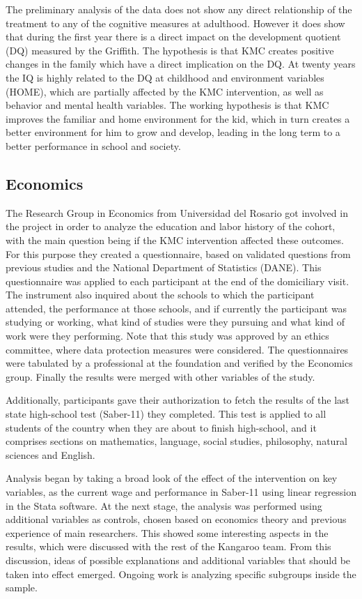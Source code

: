 The preliminary analysis of the data does not show any direct relationship of the treatment to any of the cognitive measures at adulthood. However it does show that during the first year there is a direct impact on the development quotient (DQ) measured by the Griffith. The hypothesis is that KMC creates positive changes in the family which have a direct implication on the DQ. At twenty years the IQ is highly related to the DQ at childhood and  environment variables (HOME), which are partially affected by the KMC intervention, as well as behavior and mental health variables. The working hypothesis is that KMC improves the familiar and home environment for the kid, which in turn creates a better environment for him to grow and develop, leading in the long term to a better performance in school and society.

\subsection{Economics}

The Research Group in Economics from Universidad del Rosario got involved in the project in order to analyze the education and labor history of the cohort, with the main question being if the KMC intervention affected these outcomes. For this purpose they created a questionnaire, based on validated questions from previous studies and the National Department of Statistics (DANE). This questionnaire was applied to each participant at the end of the domiciliary visit. The instrument also inquired about the schools to which the participant attended, the performance at those schools, and if currently the participant was studying or working, what kind of studies were they pursuing and what kind of work were they performing. Note that this study was approved by an ethics committee, where data protection measures were considered. The questionnaires were tabulated by a professional at the foundation and verified by the Economics group. Finally the results were merged with other variables of the study.

Additionally, participants gave their authorization to fetch the results of the last state high-school test (Saber-11) they completed. This test is applied to all students of the country when they are about to finish high-school, and it comprises sections on mathematics, language, social studies, philosophy,  natural sciences and English.

Analysis began by taking a broad look of the effect of the intervention on key variables, as the current wage and performance in Saber-11 using linear regression in the Stata software. At the next stage, the analysis was performed using additional variables as controls, chosen based on economics theory and previous experience of main researchers. This showed some interesting aspects in the results, which were discussed with the rest of the Kangaroo team. From this discussion, ideas of possible explanations and additional variables that should be taken into effect emerged. Ongoing work is analyzing specific subgroups inside the sample. 

